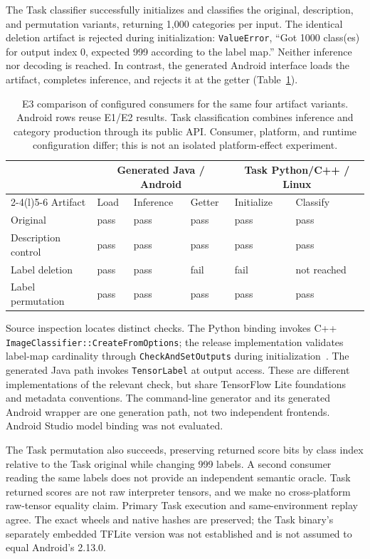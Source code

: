 \documentclass[10pt,twocolumn,letterpaper]{article}
\newcommand{\code}[1]{\texttt{#1}}
\begin{document}
The Task classifier successfully initializes and classifies the original, description, and permutation variants, returning 1,000 categories per input. The identical deletion artifact is rejected during initialization: \code{ValueError}, ``Got 1000 class(es) for output index 0, expected 999 according to the label map.'' Neither inference nor decoding is reached. In contrast, the generated Android interface loads the artifact, completes inference, and rejects it at the getter (Table~\ref{tab:stages}).

\begin{table}[t]
\centering\small
\setlength{\tabcolsep}{8pt}
\begin{tabular}{@{}llllll@{}}
\toprule
 & \multicolumn{3}{c}{Generated Java / Android} & \multicolumn{2}{c}{Task Python/C++ / Linux}\\
\cmidrule(lr){2-4}\cmidrule(l){5-6}
Artifact & Load & Inference & Getter & Initialize & Classify\\
\midrule
Original & pass & pass & pass & pass & pass\\
Description control & pass & pass & pass & pass & pass\\
Label deletion & pass & pass & fail & fail & not reached\\
Label permutation & pass & pass & pass & pass & pass\\
\bottomrule
\end{tabular}
\caption{E3 comparison of configured consumers for the same four artifact variants. Android rows reuse E1/E2 results. Task classification combines inference and category production through its public API. Consumer, platform, and runtime configuration differ; this is not an isolated platform-effect experiment.}
\label{tab:stages}
\end{table}

Source inspection locates distinct checks. The Python binding invokes C++ \code{ImageClassifier::CreateFromOptions}; the release implementation validates label-map cardinality through \code{CheckAndSetOutputs} during initialization~\cite{task-classifier}. The generated Java path invokes \code{TensorLabel} at output access. These are different implementations of the relevant check, but share TensorFlow Lite foundations and metadata conventions. The command-line generator and its generated Android wrapper are one generation path, not two independent frontends. Android Studio model binding was not evaluated.

The Task permutation also succeeds, preserving returned score bits by class index relative to the Task original while changing 999 labels. A second consumer reading the same labels does not provide an independent semantic oracle. Task returned scores are not raw interpreter tensors, and we make no cross-platform raw-tensor equality claim. Primary Task execution and same-environment replay agree. The exact wheels and native hashes are preserved; the Task binary's separately embedded TFLite version was not established and is not assumed to equal Android's 2.13.0.
\end{document}
